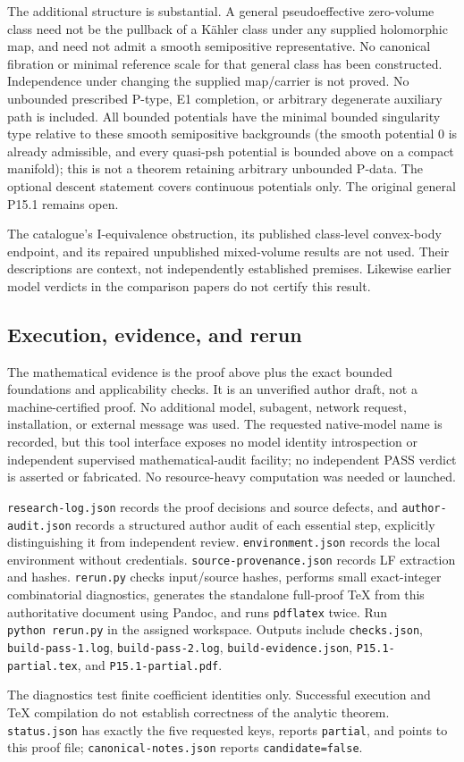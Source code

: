 \documentclass[
  11pt,
]{article}
\begin{document}
The additional structure is substantial. A general pseudoeffective
zero-volume class need not be the pullback of a Kähler class under any
supplied holomorphic map, and need not admit a smooth semipositive
representative. No canonical fibration or minimal reference scale for
that general class has been constructed. Independence under changing the
supplied map/carrier is not proved. No unbounded prescribed P-type, E1
completion, or arbitrary degenerate auxiliary path is included. All
bounded potentials have the minimal bounded singularity type relative to
these smooth semipositive backgrounds (the smooth potential \(0\) is
already admissible, and every quasi-psh potential is bounded above on a
compact manifold); this is not a theorem retaining arbitrary unbounded
P-data. The optional descent statement covers continuous potentials
only. The original general P15.1 remains open.

The catalogue's I-equivalence obstruction, its published class-level
convex-body endpoint, and its repaired unpublished mixed-volume results
are not used. Their descriptions are context, not independently
established premises. Likewise earlier model verdicts in the comparison
papers do not certify this result.

\subsection{Execution, evidence, and
rerun}\label{execution-evidence-and-rerun}

The mathematical evidence is the proof above plus the exact bounded
foundations and applicability checks. It is an unverified author draft,
not a machine-certified proof. No additional model, subagent, network
request, installation, or external message was used. The requested
native-model name is recorded, but this tool interface exposes no model
identity introspection or independent supervised mathematical-audit
facility; no independent PASS verdict is asserted or fabricated. No
resource-heavy computation was needed or launched.

\texttt{research-log.json} records the proof decisions and source
defects, and \texttt{author-audit.json} records a structured author
audit of each essential step, explicitly distinguishing it from
independent review. \texttt{environment.json} records the local
environment without credentials. \texttt{source-provenance.json} records
LF extraction and hashes. \texttt{rerun.py} checks input/source hashes,
performs small exact-integer combinatorial diagnostics, generates the
standalone full-proof TeX from this authoritative document using Pandoc,
and runs \texttt{pdflatex} twice. Run \texttt{python\ rerun.py} in the
assigned workspace. Outputs include \texttt{checks.json},
\texttt{build-pass-1.log}, \texttt{build-pass-2.log},
\texttt{build-evidence.json}, \texttt{P15.1-partial.tex}, and
\texttt{P15.1-partial.pdf}.

The diagnostics test finite coefficient identities only. Successful
execution and TeX compilation do not establish correctness of the
analytic theorem. \texttt{status.json} has exactly the five requested
keys, reports \texttt{partial}, and points to this proof file;
\texttt{canonical-notes.json} reports \texttt{candidate=false}.
\end{document}
